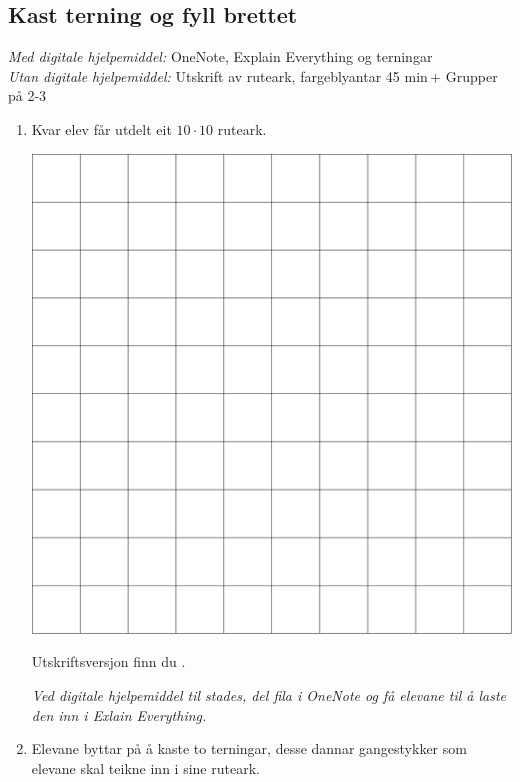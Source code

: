 \subsection{Kast terning og fyll brettet}
\lst{	\begin{itemize}
		\item \gnga
		\item \ara
\end{itemize}}
{\textsl{Med digitale hjelpemiddel:} OneNote, Explain Everything og terningar\\
\textsl{Utan digitale hjelpemiddel:} Utskrift av ruteark, fargeblyantar}
{45 min\,+}
{Grupper på 2-3}
{

\begin{enumerate}
	\item Kvar elev får utdelt eit $ 10\cdot10 $ ruteark. 
	\begin{center}
		\includegraphics[scale=0.075]{gong1}
	\end{center}
 Utskriftsversjon finn du .\vsk
 
\textit{Ved digitale hjelpemiddel til stades, del fila i OneNote og få elevane til å laste den inn i Exlain Everything.}
	\item Elevane byttar på å kaste to terningar, desse dannar gangestykker som elevane skal teikne inn i sine ruteark.\vsk
	

\end{enumerate}}
